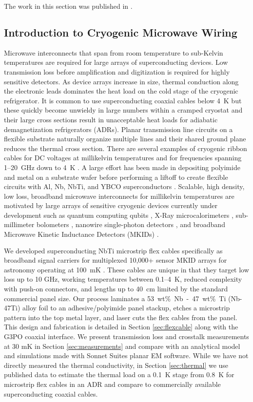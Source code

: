 The work in this section was published in \textcite{Walter_flexcable}. 

\subsection{Introduction to Cryogenic Microwave Wiring}
Microwave interconnects that span from room temperature to sub-Kelvin temperatures are required for large arrays of superconducting devices. Low transmission loss before amplification and digitization is required for highly sensitive detectors. As device arrays increase in size, thermal conduction along the electronic leads dominates the heat load on the cold stage of the cryogenic refrigerator. It is common to use superconducting coaxial cables below 4~K but these quickly become unwieldy in large numbers within a cramped cryostat and their large cross sections result in unacceptable heat loads for adiabatic demagnetization refrigerators (ADRs). Planar transmission line circuits on a flexible substrate naturally organize multiple lines and their shared ground plane reduces the thermal cross section. There are several examples of cryogenic ribbon cables for DC voltages at millikelvin temperatures \parencite{Woodcraft, Yung} and for frequencies spanning 1--20~GHz down to 4~K \parencite{Harris, McGarey}. A large effort has been made in depositing polyimide and metal on a substrate wafer before performing a liftoff to create flexible circuits with Al, Nb, NbTi, and YBCO superconductors \parencite{Paik, Allen, vanWeers, Pappas, Tuckerman}. Scalable, high density, low loss, broadband microwave interconnects for millikelvin temperatures are motivated by large arrays of sensitive cryogenic devices currently under development such as quantum computing qubits \parencite{Martinis}, X-Ray microcalorimeters \parencite{Ulbricht}, sub-millimeter bolometers \parencite{SCUBA2}, nanowire single-photon detectors \parencite{Verma, Bellei}, and broadband Microwave Kinetic Inductance Detectors (MKIDs) \parencite{NIKA2, MUSIC, ARCONS, Meeker2018}.

We developed superconducting NbTi microstrip flex cables specifically as broadband signal carriers for multiplexed 10,000+ sensor MKID arrays for astronomy operating at 100~mK \parencite{Meeker2018, PICTURE-C}. These cables are unique in that they target low loss up to 10 GHz, working temperatures between 0.1--4~K,  reduced complexity with push-on connectors, and lengths up to 40~cm limited by the standard commercial panel size. Our process laminates a 53~wt\%~Nb~-~47~wt\%~Ti (Nb-47Ti) alloy foil to an adhesive/polyimide panel stackup, etches a microstrip pattern into the top metal layer, and laser cuts the flex cables from the panel. This design and fabrication is detailed in Section \ref{sec:flexcable} along with the G3PO coaxial interface. We present transmission loss and crosstalk measurements at 30 mK in Section \ref{sec:measurements} and compare with an analytical model and simulations made with Sonnet Suites planar EM software. While we have not directly measured the thermal conductivity, in Section \ref{sec:thermal} we use published data to estimate the thermal load on a 0.1~K stage from 0.8~K for microstrip flex cables in an ADR and compare to commercially available superconducting coaxial cables. 

